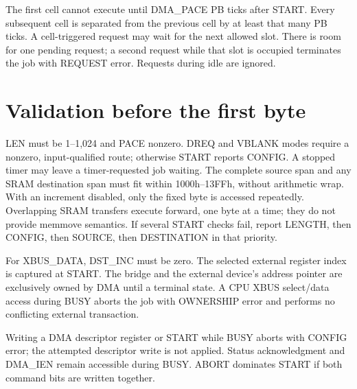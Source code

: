 \documentclass[10pt]{article}
\begin{document}
The first cell cannot execute until DMA\_PACE PB ticks after START. Every subsequent cell is separated from the previous cell by at least that many PB ticks. A cell-triggered request may wait for the next allowed slot. There is room for one pending request; a second request while that slot is occupied terminates the job with REQUEST error. Requests during idle are ignored.
\begin{center}
\end{center}
\section*{Validation before the first byte}
LEN must be 1--1,024 and PACE nonzero. DREQ and VBLANK modes require a nonzero, input-qualified route; otherwise START reports CONFIG. A stopped timer may leave a timer-requested job waiting. The complete source span and any SRAM destination span must fit within 1000h--13FFh, without arithmetic wrap. With an increment disabled, only the fixed byte is accessed repeatedly. Overlapping SRAM transfers execute forward, one byte at a time; they do not provide memmove semantics. If several START checks fail, report LENGTH, then CONFIG, then SOURCE, then DESTINATION in that priority.

For XBUS\_DATA, DST\_INC must be zero. The selected external register index is captured at START. The bridge and the external device's address pointer are exclusively owned by DMA until a terminal state. A CPU XBUS select/data access during BUSY aborts the job with OWNERSHIP error and performs no conflicting external transaction.

Writing a DMA descriptor register or START while BUSY aborts with CONFIG error; the attempted descriptor write is not applied. Status acknowledgment and DMA\_IEN remain accessible during BUSY. ABORT dominates START if both command bits are written together.
\vfill{}
\end{document}
